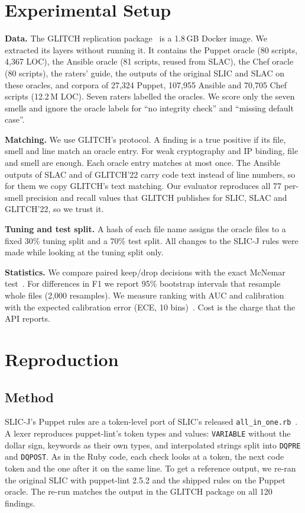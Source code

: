 \documentclass[conference]{IEEEtran}
\newcommand{\slicj}{SLIC-J}
\begin{document}
\section{Experimental Setup}
\textbf{Data.} The GLITCH replication package~\cite{glitchpkg2022} is a 1.8\,GB Docker image. We extracted its layers
without running it. It contains the Puppet oracle (80 scripts, 4{,}367 LOC), the Ansible oracle (81 scripts, reused from
SLAC), the Chef oracle (80 scripts), the raters' guide, the outputs of the original SLIC and SLAC on these oracles, and
corpora of 27{,}324 Puppet, 107{,}955 Ansible and 70{,}705 Chef scripts (12.2\,M LOC). Seven raters labelled the
oracles. We score only the seven smells and ignore the oracle labels for ``no integrity check'' and ``missing default
case''.

\textbf{Matching.} We use GLITCH's protocol. A finding is a true positive if its file, smell and line match an oracle
entry. For weak cryptography and IP binding, file and smell are enough. Each oracle entry matches at most once. The
Ansible outputs of SLAC and of GLITCH'22 carry code text instead of line numbers, so for them we copy GLITCH's text
matching. Our evaluator reproduces all 77 per-smell precision and recall values that GLITCH publishes for SLIC, SLAC
and GLITCH'22, so we trust it.

\textbf{Tuning and test split.} A hash of each file name assigns the oracle files to a fixed 30\% tuning split and a
70\% test split. All changes to the \slicj{} rules were made while looking at the tuning split only.

\textbf{Statistics.} We compare paired keep/drop decisions with the exact McNemar test~\cite{mcnemar1947}. For
differences in F1 we report 95\% bootstrap intervals that resample whole files (2{,}000 resamples). We measure ranking
with AUC and calibration with the expected calibration error (ECE, 10 bins)~\cite{guo2017calibration}. Cost is the
charge that the API reports.

\section{Reproduction}\label{sec:repro}
\subsection{Method}
\slicj{}'s Puppet rules are a token-level port of SLIC's released \texttt{all\_in\_one.rb}~\cite{iacsec}. A lexer
reproduces puppet-lint's token types and values: \texttt{VARIABLE} without the dollar sign, keywords as their own
types, and interpolated strings split into \texttt{DQPRE} and \texttt{DQPOST}. As in the Ruby code, each check looks at
a token, the next code token and the one after it on the same line. To get a reference output, we re-ran the original
SLIC with puppet-lint 2.5.2 and the shipped rules on the Puppet oracle. The re-run matches the output in the GLITCH
package on all 120 findings.
\end{document}
